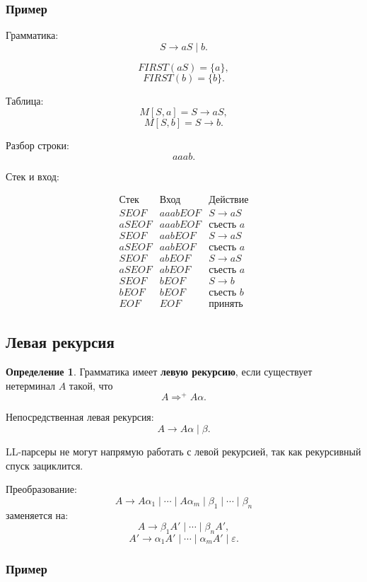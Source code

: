 \documentclass[12pt,a4paper]{article}
\theoremstyle{definition}
\newtheorem{definition}{Определение}
\theoremstyle{plain}
\begin{document}
\subsubsection*{Пример}

Грамматика:
\[
S\to aS \mid b.
\]

\[
FIRST(aS)=\{a\},
\]
\[
FIRST(b)=\{b\}.
\]

Таблица:
\[
M[S,a]=S\to aS,
\]
\[
M[S,b]=S\to b.
\]

Разбор строки:
\[
aaab.
\]

Стек и вход:

\[
\begin{array}{c|c|c}
\text{Стек} & \text{Вход} & \text{Действие}\\
\hline
SEOF & aaabEOF & S\to aS\\
aSEOF & aaabEOF & \text{съесть } a\\
SEOF & aabEOF & S\to aS\\
aSEOF & aabEOF & \text{съесть } a\\
SEOF & abEOF & S\to aS\\
aSEOF & abEOF & \text{съесть } a\\
SEOF & bEOF & S\to b\\
bEOF & bEOF & \text{съесть } b\\
EOF & EOF & \text{принять}
\end{array}
\]

\subsection{Левая рекурсия}

\begin{definition}
Грамматика имеет \textbf{левую рекурсию}, если существует нетерминал $A$ такой, что
\[
A\Rightarrow^+ A\alpha.
\]
\end{definition}

Непосредственная левая рекурсия:
\[
A\to A\alpha \mid \beta.
\]

LL-парсеры не могут напрямую работать с левой рекурсией, так как рекурсивный спуск зациклится.

Преобразование:
\[
A\to A\alpha_1 \mid \cdots \mid A\alpha_m \mid \beta_1 \mid \cdots \mid \beta_n
\]
заменяется на:
\[
A\to \beta_1A' \mid \cdots \mid \beta_nA',
\]
\[
A'\to \alpha_1A' \mid \cdots \mid \alpha_mA' \mid \varepsilon.
\]

\subsubsection*{Пример}
\end{document}
